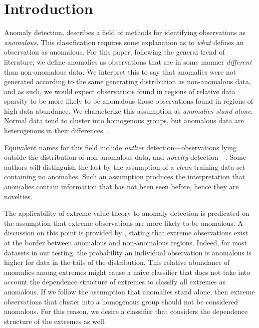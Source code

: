 \section{Introduction}



Anomaly detection, describes a field of methods for identifying observations as 
    \emph{anomalous}. This classification requires some explanation as to 
    \emph{what} defines an observation as anomalous. For this paper, following 
    the general trend of literature, we define anomalies as observations that 
    are in some manner \emph{different} than non-anomalous data. We interpret 
    this to say that anomalies were not generated according to the same generating 
    distribution as non-anomalous data, and as such, we would expect observations 
    found in regions of relative data sparsity to be more likely to be anomalous 
    those observations found in regions of high data abundance.  We characterize 
    this assumption as \emph{anomalies stand alone}.  Normal data tend to cluster 
    into homogenous groups, but anomalous data are heterogenous in their differences.
    .

    Equivalent names for this field include \emph{outlier} detection---observations lying outside the
    distribution of non-anomalous data, and \emph{novelty} detection---.  Some authors will
    distinguish the last by the assumption of a \emph{clean} training data set containing no anomalies.  Such
    an assumption produces the interpretation that anomalies contain information that has not been seen before,
    hence they are novelties.

The applicability of extreme value theory to anomaly detection is predicated on the assumption that
  extreme observations are more likely to be anomalous.  A discussion on this point is provided by \cite{goix2017},
  stating that extreme observations exist at the border between anomalous and non-anomalous regions.  Indeed,
  for most datasets in our testing, the probability an individual observation is anomalous is higher
  for data in the tails of the distribution. This relative abundance of anomalies among extremes might 
  cause a naive classifier that does not take into account the dependence structure of extremes to 
  classify all extremes as anomalous.  If we follow the assumption that anomalies stand alone, then extreme
  observations that cluster into a homogenous group should not be considered anomalous.  For this reason, we
  desire a classifier that considers the dependence structure of the extremes as well.

